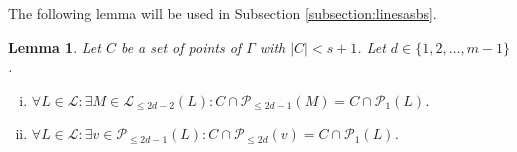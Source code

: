 \documentclass[12pt]{article}
\newcommand{\Points}{\mathcal{P}}
\newcommand{\Lines}{\mathcal{L}}
\newtheorem{lemma}{Lemma}
\theoremstyle{remark}
\begin{document}

The following lemma will be used in Subsection \ref{subsection:linesasbs}. 
\begin{lemma}\label{starLemma}
	Let \(C\) be a set of points of $\Gamma$ with \(|C|<s+1\). Let \(d\in \{1,2,\dots,m-1\}\).
	\begin{enumerate}[(i)]
		\item \(\forall L \in \Lines: \exists M \in \Lines_{\le 2d-2}(L): C\cap \Points_{\le2d-1}(M) = C\cap \Points_{1}(L)\).
		\item \(\forall L \in \Lines: \exists v \in \Points_{\le 2d-1}(L): C\cap \Points_{\le2d}(v) = C\cap \Points_{1}(L)\).
	\end{enumerate}
\end{lemma}
\end{document}
